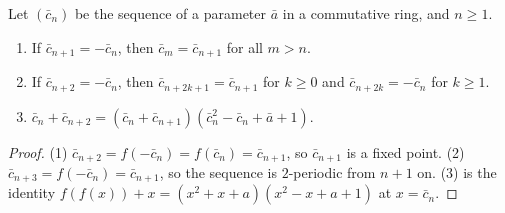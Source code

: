 \begin{lemma}
  \label{lem:orbit}
  \leanok
  Let $(\bar c_n)$ be the sequence of a parameter $\bar a$ in a commutative ring, and $n \ge 1$.
  \begin{enumerate}
    \item If $\bar c_{n+1} = -\bar c_n$, then $\bar c_m = \bar c_{n+1}$ for all $m > n$.
    \item If $\bar c_{n+2} = -\bar c_n$, then $\bar c_{n+2k+1} = \bar c_{n+1}$ for $k \ge 0$ and
          $\bar c_{n+2k} = -\bar c_n$ for $k \ge 1$.
    \item $\bar c_n + \bar c_{n+2} = (\bar c_n + \bar c_{n+1})(\bar c_n^2 - \bar c_n + \bar a + 1)$.
  \end{enumerate}
\end{lemma}
\begin{proof}
  \leanok
  (1) $\bar c_{n+2} = f(-\bar c_n) = f(\bar c_n) = \bar c_{n+1}$, so $\bar c_{n+1}$ is a fixed
  point. (2) $\bar c_{n+3} = f(-\bar c_n) = \bar c_{n+1}$, so the sequence is $2$-periodic from
  $n+1$ on. (3) is the identity $f(f(x)) + x = (x^2 + x + a)(x^2 - x + a + 1)$ at $x = \bar c_n$.
\end{proof}

